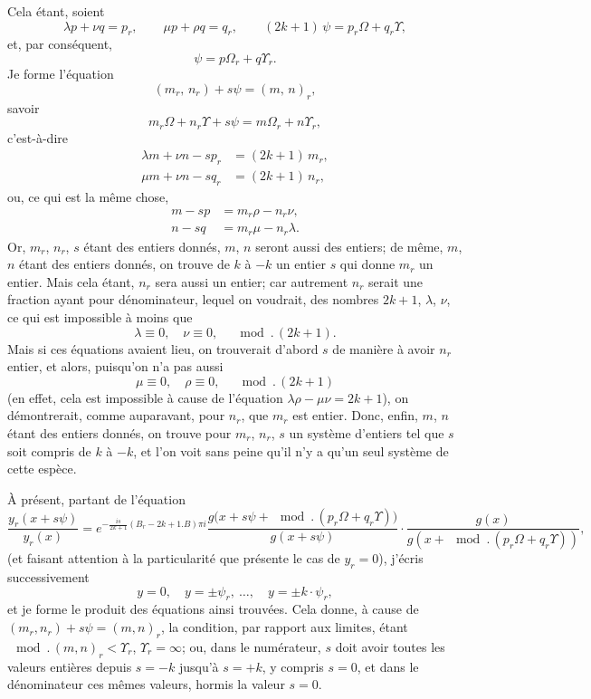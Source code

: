 \documentclass[11pt,a4paper]{book}
\begin{document}
Cela \'etant, soient
\[
\lambda p + \nu q = p_r, \qquad
\mu p + \rho q = q_r, \qquad
(2k+1)\,\psi = p_r\Omega + q_r\Upsilon,
\]
et, par cons\'equent,
\[
\psi = p\Omega_r + q\Upsilon_r.
\]
Je forme l'\'equation
\[
(m_r,\, n_r) + s\psi = (m,\, n)_r,
\]
savoir
\[
m_r\Omega + n_r\Upsilon + s\psi = m\Omega_r + n\Upsilon_r,
\]
c'est-\`a-dire
\begin{align*}
\lambda m + \nu n - sp_r &= (2k+1)\,m_r, \\
\mu m + \nu n - sq_r &= (2k+1)\,n_r,
\end{align*}
ou, ce qui est la m\^eme chose,
\begin{align*}
m - sp &= m_r\rho - n_r\nu, \\
n - sq &= m_r\mu - n_r\lambda.
\end{align*}
Or, $m_r$, $n_r$, $s$ \'etant des entiers donn\'es, $m$, $n$ seront aussi des
entiers; de m\^eme, $m$, $n$ \'etant des entiers donn\'es, on trouve de $k$ \`a
$-k$ un entier $s$ qui donne $m_r$ un entier. Mais cela \'etant, $n_r$ sera
aussi un entier; car autrement $n_r$ serait une fraction ayant pour
d\'enominateur, lequel on voudrait, des nombres $2k+1$, $\lambda$, $\nu$, ce qui
est impossible \`a moins que
\[
\lambda \equiv 0,\quad \nu \equiv 0, \quad \mod.\,(2k+1).
\]
Mais si ces \'equations avaient lieu, on trouverait d'abord $s$ de mani\`ere
\`a avoir $n_r$ entier, et alors, puisqu'on n'a pas aussi
\[
\mu \equiv 0,\quad \rho \equiv 0, \quad \mod.\,(2k+1)
\]
(en effet, cela est impossible \`a cause de l'\'equation
$\lambda\rho - \mu\nu = 2k+1$), on d\'emontrerait, comme auparavant, pour
$n_r$, que $m_r$ est entier. Donc, enfin, $m$, $n$ \'etant des entiers donn\'es,
on trouve pour $m_r$, $n_r$, $s$ un syst\`eme d'entiers tel que $s$ soit
compris de $k$ \`a $-k$, et l'on voit sans peine qu'il n'y a qu'un seul
syst\`eme de cette esp\`ece.

\medskip

\`A pr\'esent, partant de l'\'equation
\[
\frac{y_r(x+s\psi)}{y_r(x)}
= e^{-\frac{is}{2k+1}(B_r-2k+1.B)\pi i}
\frac{g\bigl(x + s\psi + \mod.\,(p_r\Omega+q_r\Upsilon)\bigr)}{g(x+s\psi)}
\cdot
\frac{g(x)}{g(x+\mod.\,(p_r\Omega+q_r\Upsilon))},
\]
(et faisant attention \`a la particularit\'e que pr\'esente le cas de
$y_r = 0$), j'\'ecris successivement
\[
y = 0,\quad y = \pm\psi_r,\ \ldots,\quad y = \pm k\cdot\psi_r,
\]
et je forme le produit des \'equations ainsi trouv\'ees. Cela donne, \`a cause de
$(m_r, n_r) + s\psi = (m,n)_r$, la condition, par rapport aux limites,
\'etant $\mod.\,(m,n)_r < \Upsilon_r$, $\Upsilon_r = \infty$; ou, dans le
num\'erateur, $s$ doit avoir toutes les valeurs enti\`eres depuis $s=-k$
jusqu'\`a $s=+k$, y compris $s=0$, et dans le d\'enominateur ces m\^emes
valeurs, hormis la valeur $s=0$.
\end{document}
